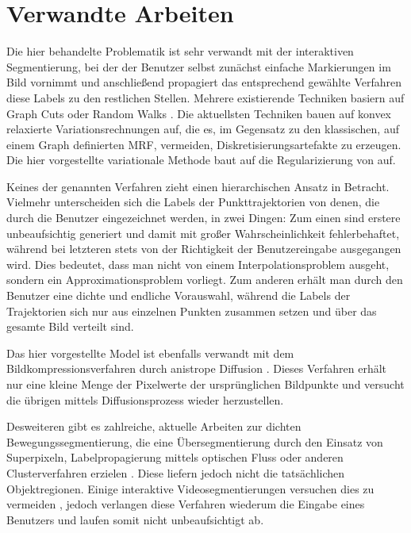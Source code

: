 \section{Verwandte Arbeiten}


Die hier behandelte Problematik ist sehr verwandt mit der interaktiven Segmentierung,
bei der der Benutzer selbst zunächst einfache Markierungen im Bild vornimmt
und anschließend propagiert das entsprechend gewählte Verfahren diese Labels zu den restlichen Stellen.
Mehrere existierende Techniken basiern auf Graph Cuts \cite{004} oder Random Walks \cite{012}.
Die aktuellsten Techniken bauen auf konvex relaxierte Variationsrechnungen \cite{023,018,014,016} auf, die es, im Gegensatz zu den klassischen,
auf einem Graph definierten MRF, vermeiden, Diskretisierungsartefakte zu erzeugen.
Die hier vorgestellte variationale Methode baut auf die Regularizierung von \cite{014} auf.

Keines der genannten Verfahren zieht einen hierarchischen Ansatz in Betracht. Vielmehr unterscheiden sich die Labels
der Punkttrajektorien von denen, die durch die Benutzer eingezeichnet werden, in zwei Dingen:
Zum einen sind erstere unbeaufsichtig generiert und damit mit großer Wahrscheinlichkeit fehlerbehaftet, während bei letzteren stets
von der Richtigkeit der Benutzereingabe ausgegangen wird. Dies bedeutet, dass man nicht von einem Interpolationsproblem ausgeht,
sondern ein Approximationsproblem vorliegt.
Zum anderen erhält man durch den Benutzer eine dichte und endliche Vorauswahl, während die Labels der Trajektorien sich nur aus einzelnen Punkten zusammen
setzen und über das gesamte Bild verteilt sind.

Das hier vorgestellte Model ist ebenfalls verwandt mit dem Bildkompressionsverfahren durch anistrope Diffusion \cite{011}. Dieses
Verfahren erhält nur eine kleine Menge der Pixelwerte der ursprünglichen Bildpunkte und versucht die übrigen mittels
Diffusionsprozess wieder herzustellen.

Desweiteren gibt es zahlreiche, aktuelle Arbeiten zur dichten Bewegungssegmentierung, die eine Übersegmentierung durch den Einsatz von
Superpixeln, Labelpropagierung mittels optischen Fluss oder anderen Clusterverfahren erzielen \cite{005,013,024,015}.
Diese liefern jedoch nicht die tatsächlichen Objektregionen.
Einige interaktive Videosegmentierungen versuchen dies zu vermeiden \cite{003,019}, jedoch verlangen diese Verfahren wiederum die Eingabe eines
Benutzers und laufen somit nicht unbeaufsichtigt ab.